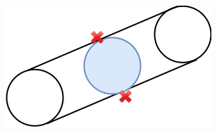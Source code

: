 \documentclass[a4paper,11pt]{article}
\theoremstyle{mytheor}
\begin{document}
\begin{figure}
    \begin{subfigure}{0.4\textwidth}
        \includegraphics[width=1.0\linewidth]{png/go3.png}
        \caption{}
    \end{subfigure}
\end{figure}
\end{document}
